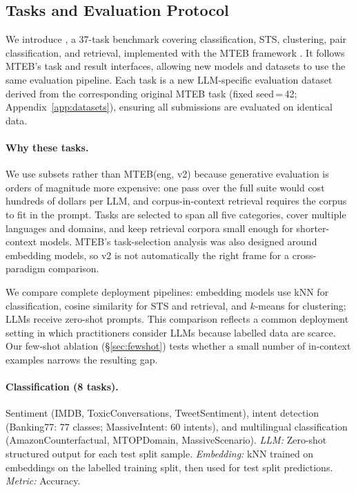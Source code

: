 \subsection{Tasks and Evaluation Protocol}
\label{sec:tasks}

We introduce \textbf{\mteblm}, a 37-task benchmark covering classification, STS, clustering, pair classification, and retrieval, implemented with the MTEB framework \citep{muennighoff2023mteb}.
It follows MTEB's task and result interfaces, allowing new models and datasets to use the same evaluation pipeline.
Each \mteblm{} task is a new LLM-specific evaluation dataset derived from the corresponding original MTEB task (fixed seed\,=\,42; Appendix~\ref{app:datasets}), ensuring all submissions are evaluated on identical data.

\paragraph{Why these tasks.}
We use subsets rather than MTEB(eng, v2) because generative evaluation is orders of magnitude more expensive: one pass over the full suite would cost hundreds of dollars per LLM, and corpus-in-context retrieval requires the corpus to fit in the prompt.
Tasks are selected to span all five categories, cover multiple languages and domains, and keep retrieval corpora small enough for shorter-context models.
MTEB's task-selection analysis was also designed around embedding models, so v2 is not automatically the right frame for a cross-paradigm comparison.

We compare complete deployment pipelines: embedding models use kNN for classification, cosine similarity for STS and retrieval, and $k$-means for clustering; LLMs receive zero-shot prompts.
This comparison reflects a common deployment setting in which practitioners consider LLMs because labelled data are scarce.
Our few-shot ablation (\S\ref{sec:fewshot}) tests whether a small number of in-context examples narrows the resulting gap.

\paragraph{Classification (8 tasks).}
Sentiment (IMDB, ToxicConversations, TweetSentiment), intent detection (Banking77: 77 classes; MassiveIntent: 60 intents), and multilingual classification (AmazonCounterfactual, MTOPDomain, MassiveScenario).
\emph{LLM:} Zero-shot structured output for each test split sample.
\emph{Embedding:} kNN trained on embeddings on the labelled training split, then used for test split predictions.
\emph{Metric:} Accuracy.

